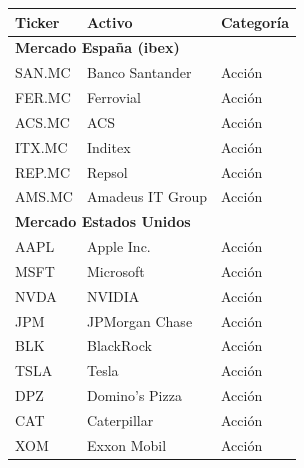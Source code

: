 \documentclass[
]{article}
\begin{document}
\begin{table}[H]
\centering
\small
\begin{tabular}{lll}
\toprule
\textbf{Ticker} & \textbf{Activo} & \textbf{Categoría} \\
\midrule

\multicolumn{3}{l}{\textbf{Mercado España (\gls{ibex})}} \\
SAN.MC  & Banco Santander        & Acción \\
FER.MC  & Ferrovial             & Acción \\
ACS.MC  & ACS                   & Acción \\
ITX.MC  & Inditex               & Acción \\
REP.MC  & Repsol                & Acción \\
AMS.MC  & Amadeus IT Group      & Acción \\

\midrule
\multicolumn{3}{l}{\textbf{Mercado Estados Unidos}} \\
AAPL    & Apple Inc.            & Acción \\
MSFT    & Microsoft             & Acción \\
NVDA    & NVIDIA                & Acción \\
JPM     & JPMorgan Chase        & Acción \\
BLK     & BlackRock             & Acción \\
TSLA    & Tesla                 & Acción \\
DPZ     & Domino's Pizza        & Acción \\
CAT     & Caterpillar           & Acción \\
XOM     & Exxon Mobil           & Acción \\


\end{tabular}
\end{table}
\end{document}

